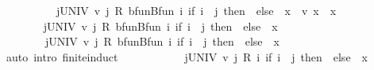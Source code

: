 \begin{isabellebody}
\ \ \isamarkupfalse%
\ {\isacharminus}{\kern0pt}\isanewline
\ \ \ \ \isamarkupfalse%
\ {\isachardoublequoteopen}{\isacharparenleft}{\kern0pt}{\isasymSum}j{\isasymin}UNIV{\isachardot}{\kern0pt}\ {\isacharparenleft}{\kern0pt}v\ j\ {\isacharasterisk}{\kern0pt}\isactrlsub R\ bfun{\isachardot}{\kern0pt}Bfun\ {\isacharparenleft}{\kern0pt}{\isasymlambda}i{\isachardot}{\kern0pt}\ if\ i\ {\isacharequal}{\kern0pt}\ j\ then\ {}\ else\ {}{\isacharparenright}{\kern0pt}{\isacharparenright}{\kern0pt}{\isacharparenright}{\kern0pt}\ x\ {\isacharequal}{\kern0pt}\ v\ x{\isachardoublequoteclose}\ \ x\isanewline
\ \ \ \ \isamarkupfalse%
\ {\isacharminus}{\kern0pt}\isanewline
\ \ \ \ \ \ \isamarkupfalse%
\ {\isachardoublequoteopen}{\isacharparenleft}{\kern0pt}{\isasymSum}j{\isasymin}UNIV{\isachardot}{\kern0pt}\ {\isacharparenleft}{\kern0pt}v\ j\ {\isacharasterisk}{\kern0pt}\isactrlsub R\ bfun{\isachardot}{\kern0pt}Bfun\ {\isacharparenleft}{\kern0pt}{\isasymlambda}i{\isachardot}{\kern0pt}\ if\ i\ {\isacharequal}{\kern0pt}\ j\ then\ {}\ else\ {}{\isacharparenright}{\kern0pt}{\isacharparenright}{\kern0pt}{\isacharparenright}{\kern0pt}\ x\ {\isacharequal}{\kern0pt}\ \isanewline
\ \ \ \ \ \ \ \ {\isacharparenleft}{\kern0pt}{\isasymSum}j{\isasymin}UNIV{\isachardot}{\kern0pt}\ {\isacharparenleft}{\kern0pt}v\ j\ {\isacharasterisk}{\kern0pt}\isactrlsub R\ bfun{\isachardot}{\kern0pt}Bfun\ {\isacharparenleft}{\kern0pt}{\isasymlambda}i{\isachardot}{\kern0pt}\ if\ i\ {\isacharequal}{\kern0pt}\ j\ then\ {}\ else\ {}{\isacharparenright}{\kern0pt}\ x{\isacharparenright}{\kern0pt}{\isacharparenright}{\kern0pt}{\isachardoublequoteclose}\isanewline
\ \ \ \ \ \ \ \ \isamarkupfalse%
\ {\isacharparenleft}{\kern0pt}auto\ intro{\isacharcolon}{\kern0pt}\ finite{\isacharunderscore}{\kern0pt}induct{\isacharparenright}{\kern0pt}\isanewline
\ \ \ \ \ \ \isamarkupfalse%
\ \isamarkupfalse%
\ {\isachardoublequoteopen}{\isasymdots}\ {\isacharequal}{\kern0pt}\ {\isacharparenleft}{\kern0pt}{\isasymSum}j{\isasymin}UNIV{\isachardot}{\kern0pt}\ {\isacharparenleft}{\kern0pt}v\ j\ {\isacharasterisk}{\kern0pt}\isactrlsub R\ {\isacharparenleft}{\kern0pt}{\isasymlambda}i{\isachardot}{\kern0pt}\ if\ i\ {\isacharequal}{\kern0pt}\ j\ then\ {}\ else\ {}{\isacharparenright}{\kern0pt}\ x{\isacharparenright}{\kern0pt}{\isacharparenright}{\kern0pt}{\isachardoublequoteclose}\isanewline
\ \ \ \ \ \ \ \ \isamarkupfalse%

\end{isabellebody}
